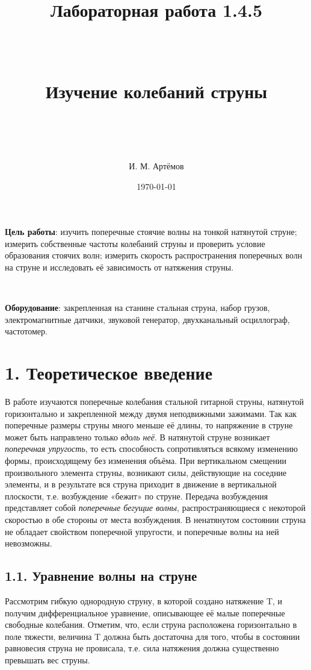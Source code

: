 \documentclass[a4paper]{article}
\begin{document}
\title{\textbf{Лабораторная работа 1.4.5}

\

Изучение колебаний струны

\
}
\author{И. М. Артёмов}
\date{\today}
\maketitle
\noindent
\textbf{Цель работы}: изучить поперечные стоячие волны на тонкой натянутой струне; измерить собственные частоты колебаний струны и проверить условие образования стоячих волн; измерить скорость распространения поперечных волн на струне и исследовать её зависимость от натяжения струны.

\

\noindent
\textbf{Оборудование}: закрепленная на станине стальная струна, набор грузов, электромагнитные датчики, звуковой генератор, двухканальный осциллограф, частотомер.

\section*{1. Теоретическое введение}
В работе изучаются поперечные колебания стальной гитарной струны, натянутой горизонтально и закрепленной между двумя неподвижными зажимами. Так как поперечные размеры струны много меньше её длины, то напряжение в струне может быть направлено только \textit{вдоль неё}. В натянутой струне возникает \textit{поперечная упругость}, то есть способность сопротивляться всякому изменению формы, происходящему без изменения объёма. При вертикальном смещении произвольного элемента струны, возникают силы, действующие на соседние элементы, и в результате вся струна приходит в движение в вертикальной плоскости, т.е. возбуждение «бежит» по струне. Передача возбуждения представляет собой \textit{поперечные бегущие волны}, распространяющиеся с некоторой скоростью в обе стороны от места возбуждения. В ненатянутом состоянии струна не обладает свойством поперечной упругости, и поперечные волны на ней невозможны.

\subsection*{1.1. Уравнение волны на струне}
Рассмотрим гибкую однородную струну, в которой создано натяжение T, и получим дифференциальное уравнение, описывающее её малые
поперечные свободные колебания. Отметим, что, если струна расположена
горизонтально в поле тяжести, величина T должна быть достаточна для
того, чтобы в состоянии равновесия струна не провисала, т.е. сила натяжения должна существенно превышать вес струны.
\end{document}
